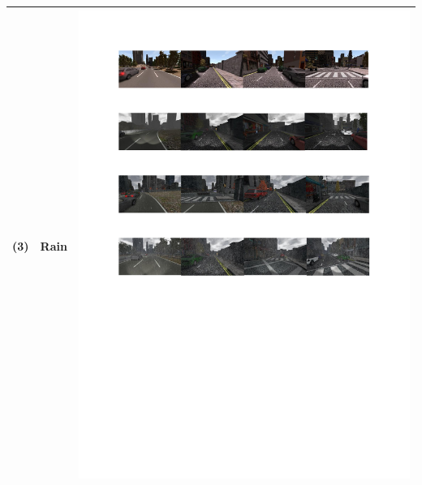\documentclass{svproc}
\begin{document}
\begin{table}[!t]
\begin{tabular}{|C{1.5cm}|c|C{8.5cm}|}
			(3)	& Rain &  \begin{minipage}{.9\textwidth}\includegraphics[scale=.5,trim=2cm 16.5cm 2cm 10.5cm,clip]{examples.pdf}\end{minipage} \\ \hline

\end{tabular}
\end{table}
\end{document}
